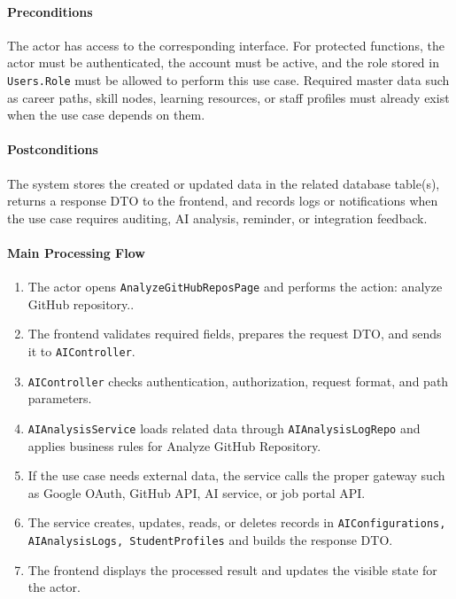 \paragraph{Preconditions}

The actor has access to the corresponding interface. For protected functions, the actor must be authenticated, the account must be active, and the role stored in \texttt{Users.Role} must be allowed to perform this use case. Required master data such as career paths, skill nodes, learning resources, or staff profiles must already exist when the use case depends on them.

\paragraph{Postconditions}

The system stores the created or updated data in the related database table(s), returns a response DTO to the frontend, and records logs or notifications when the use case requires auditing, AI analysis, reminder, or integration feedback.

\paragraph{Main Processing Flow}

\begin{enumerate}
    \item The actor opens \texttt{AnalyzeGitHubReposPage} and performs the action: analyze GitHub repository..
    \item The frontend validates required fields, prepares the request DTO, and sends it to \texttt{AIController}.
    \item \texttt{AIController} checks authentication, authorization, request format, and path parameters.
    \item \texttt{AIAnalysisService} loads related data through \texttt{AIAnalysisLogRepo} and applies business rules for Analyze GitHub Repository.
    \item If the use case needs external data, the service calls the proper gateway such as Google OAuth, GitHub API, AI service, or job portal API.
    \item The service creates, updates, reads, or deletes records in \texttt{AIConfigurations, AIAnalysisLogs, StudentProfiles} and builds the response DTO.
    \item The frontend displays the processed result and updates the visible state for the actor.
\end{enumerate}


